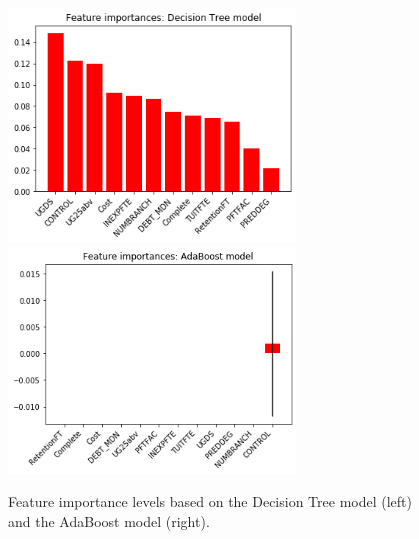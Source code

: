 \documentclass[11pt, letterpaper]{article}
\begin{document}

\begin{figure}[h]
\begin{center}
\includegraphics[width=3in]{DTFeatureImportance.png}
\includegraphics[width=3in]{ABFeatureImportance.png}

\caption{Feature importance levels based on the Decision Tree model (left) and the AdaBoost model (right).} 
\label{fig:Features}
\end{center}
\end{figure}
\end{document}
